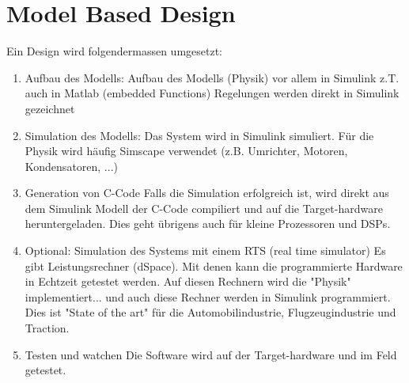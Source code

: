 \section{Model Based Design}
Ein Design wird folgendermassen umgesetzt:
\begin{enumerate}
\item {\color{magenta}Aufbau des Modells:}
Aufbau des Modells (Physik) vor allem in Simulink z.T. auch in Matlab (embedded Functions)
Regelungen werden direkt in Simulink gezeichnet
\item {\color{magenta}Simulation des Modells:}
Das System wird in Simulink simuliert.
Für die Physik wird häufig Simscape verwendet (z.B. Umrichter, Motoren, Kondensatoren, ...)
\item {\color{magenta}Generation von C-Code}
Falls die Simulation erfolgreich ist, wird direkt aus dem Simulink Modell der C-Code compiliert und auf die Target-hardware heruntergeladen.
Dies geht übrigens auch für kleine Prozessoren und DSPs.
\item {\color{magenta}Optional: Simulation des Systems mit einem RTS (real time simulator)}
Es gibt Leistungsrechner  (dSpace). Mit denen kann die programmierte Hardware in Echtzeit getestet werden.
Auf diesen Rechnern wird die "Physik" implementiert... und auch diese Rechner werden in Simulink programmiert.
Dies ist "State of the art" für die Automobilindustrie, Flugzeugindustrie und Traction.
\item {\color{magenta}Testen und watchen}
Die Software wird auf der Target-hardware und im Feld getestet. 
\end{enumerate}







